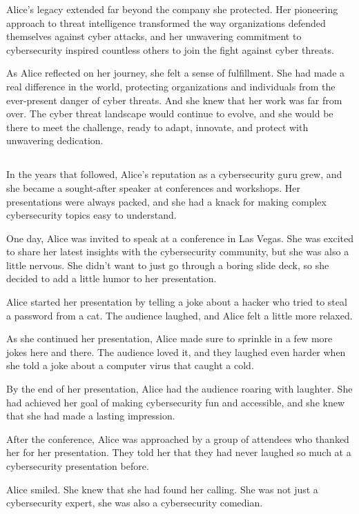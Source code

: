 \documentclass{./StyCls/MyArticle}
\begin{document}
Alice's legacy extended far beyond the company she protected. Her pioneering approach to threat intelligence transformed the way organizations defended themselves against cyber attacks, and her unwavering commitment to cybersecurity inspired countless others to join the fight against cyber threats.

As Alice reflected on her journey, she felt a sense of fulfillment. She had made a real difference in the world, protecting organizations and individuals from the ever-present danger of cyber threats. And she knew that her work was far from over. The cyber threat landscape would continue to evolve, and she would be there to meet the challenge, ready to adapt, innovate, and protect with unwavering dedication.

\subsection{}

In the years that followed, Alice's reputation as a cybersecurity guru grew, and she became a sought-after speaker at conferences and workshops. Her presentations were always packed, and she had a knack for making complex cybersecurity topics easy to understand.

One day, Alice was invited to speak at a conference in Las Vegas. She was excited to share her latest insights with the cybersecurity community, but she was also a little nervous. She didn't want to just go through a boring slide deck, so she decided to add a little humor to her presentation.

Alice started her presentation by telling a joke about a hacker who tried to steal a password from a cat. The audience laughed, and Alice felt a little more relaxed.

As she continued her presentation, Alice made sure to sprinkle in a few more jokes here and there. The audience loved it, and they laughed even harder when she told a joke about a computer virus that caught a cold.

By the end of her presentation, Alice had the audience roaring with laughter. She had achieved her goal of making cybersecurity fun and accessible, and she knew that she had made a lasting impression.

After the conference, Alice was approached by a group of attendees who thanked her for her presentation. They told her that they had never laughed so much at a cybersecurity presentation before.

Alice smiled. She knew that she had found her calling. She was not just a cybersecurity expert, she was also a cybersecurity comedian.
\end{document}
